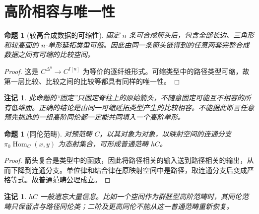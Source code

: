 \documentclass[12pt,oneside,openany,fontset=none]{ctexbook}
\theoremstyle{cn}
\newtheorem{proposition}[definition]{命题}
\newtheorem{remark}[definition]{注记}
\numberwithin{equation}{chapter}
\newcommand{\Hom}{\operatorname{Hom}}
\begin{document}
\section{高阶相容与唯一性}
\begin{proposition}[较高合成数据的可缩性]
固定 $n$ 条可合成箭头后，包含全部长边、三角形和较高面的 $n$-单形延拓类型可缩。因此由同一条箭头链得到的任意两套完整合成数据之间有可缩的比较空间。
\end{proposition}
\begin{proof}
这是 $C^{\Delta^n}\to C^{I[n]}$ 为等价的逐纤维形式。可缩类型中的路径类型可缩，故第一层比较、比较之间的比较等都具有同样的唯一性。
\end{proof}
\begin{remark}
此命题的“固定”只固定脊柱上的原始箭头，不随意固定可能互不相容的所有低维面。正确的结论是由同一可缩延拓类型产生的比较相容。不能据此断言任意预先挑选的一组高阶同伦都一定能共同填入一个高阶单形。
\end{remark}
\begin{proposition}[同伦范畴]
对预范畴 $C$，以其对象为对象，以映射空间的连通分支 $\pi_0\Hom_C(x,y)$ 为态射集合，可形成普通范畴 $hC$。
\end{proposition}
\begin{proof}
箭头复合是类型中的函数，因此将路径相关的输入送到路径相关的输出，从而下降到连通分支。单位律和结合律在原映射空间中是路径，取连通分支后变成严格等式。故普通范畴公理成立。
\end{proof}
\begin{remark}
$hC$ 一般遗忘大量信息。比如一个空间作为群胚型高阶范畴时，其同伦范畴只保留点与路径同伦类；二阶及更高同伦不能从这一普通范畴重新恢复。
\end{remark}
\end{document}
